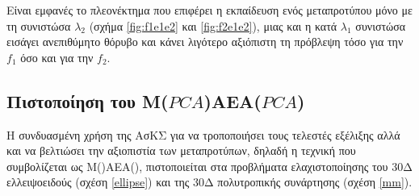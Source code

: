 
Είναι εμφανές το πλεονέκτημα που επιφέρει η εκπαίδευση ενός μεταπροτύπου μόνο με τη συνιστώσα $\lambda_2$ (σχήμα  \ref{fig:f1e1e2} και \ref{fig:f2e1e2}), μιας και η κατά $\lambda_1$ συνιστώσα εισάγει ανεπιθύμητο θόρυβο και κάνει λιγότερο αξιόπιστη τη πρόβλεψη τόσο για την  $f_1$  όσο και για την $f_2$.   

\subsection{Πιστοποίηση του Μ($PCA$)ΑΕΑ($PCA$)}

Η συνδυασμένη χρήση της ΑσΚΣ για να τροποποιήσει τους τελεστές εξέλιξης αλλά και να βελτιώσει την αξιοπιστία των μεταπροτύπων, δηλαδή η τεχνική που συμβολίζεται ως Μ()ΑΕΑ(), πιστοποιείται στα προβλήματα ελαχιστοποίησης του 30Δ ελλειψοειδούς (σχέση \ref{ellipse}) και της 30Δ πολυτροπικής συνάρτησης (σχέση \ref{mm}). 



